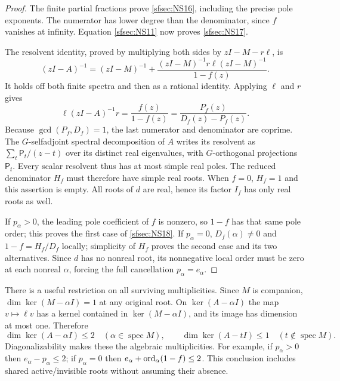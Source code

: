 \documentclass[11pt]{article}
\begin{document}
\begin{proof}
The finite partial fractions prove \eqref{sfsec:NS16}, including
the precise pole exponents. The numerator has lower degree
than the denominator, since $f$ vanishes at infinity.
Equation \eqref{sfsec:NS11} now proves \eqref{sfsec:NS17}.

The resolvent identity, proved by multiplying both sides
by $zI-M-r\ell$, is
\begin{equation}\tag{NS19}\label{sfsec:NS19}
(zI-A)^{-1}
=(zI-M)^{-1}
 +\frac{(zI-M)^{-1}r\ell(zI-M)^{-1}}{1-f(z)}.
\end{equation}
It holds off both finite spectra and then as a rational
identity. Applying $\ell$ and $r$ gives
\[
\ell(zI-A)^{-1}r=\frac{f(z)}{1-f(z)}
                 =\frac{P_f(z)}{D_f(z)-P_f(z)}.
\]
Because $\gcd(P_f,D_f)=1$, the last numerator and
denominator are coprime. The $G$-selfadjoint spectral
decomposition of $A$ writes its resolvent as
$\sum_t\mathsf P_t/(z-t)$ over its distinct real
eigenvalues, with $G$-orthogonal projections $\mathsf P_t$.
Every scalar resolvent thus has at most simple real poles.
The reduced denominator $H_f$ must therefore have simple
real roots. When $f=0$, $H_f=1$ and this assertion is empty.
All roots of $d$ are real, hence its factor $I_f$ has
only real roots as well.

If $p_\alpha>0$, the leading pole coefficient of $f$
is nonzero, so $1-f$ has that same pole order; this proves
the first case of \eqref{sfsec:NS18}. If $p_\alpha=0$,
$D_f(\alpha)\ne0$ and $1-f=H_f/D_f$ locally; simplicity
of $H_f$ proves the second case and its two alternatives.
Since $d$ has no nonreal root, its nonnegative local
order must be zero at each nonreal $\alpha$, forcing
the full cancellation $p_\alpha=e_\alpha$.
\end{proof}

There is a useful restriction on all surviving multiplicities.
Since $M$ is companion, $\dim\ker(M-\alpha I)=1$ at any
original root. On $\ker(A-\alpha I)$ the map $v\mapsto\ell v$
has a kernel contained in $\ker(M-\alpha I)$, and its image
has dimension at most one. Therefore
\begin{equation}\tag{NS20}\label{sfsec:NS20}
\dim\ker(A-\alpha I)\leq2
\quad(\alpha\in\operatorname{spec}M),\qquad
\dim\ker(A-tI)\leq1
\quad(t\notin\operatorname{spec}M).
\end{equation}
Diagonalizability makes these the algebraic multiplicities.
For example, if $p_\alpha>0$ then $e_\alpha-p_\alpha\leq2$;
if $p_\alpha=0$ then
$e_\alpha+\operatorname{ord}_\alpha(1-f)\leq2$.
This conclusion includes shared active/invisible roots
without assuming their absence.
\end{document}
